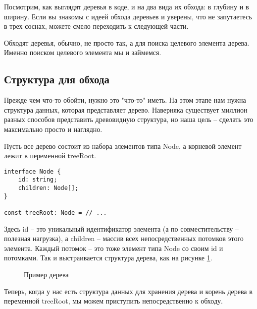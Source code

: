 \documentclass[../../article]{subfiles}
\begin{document}
{Посмотрим, как выглядят деревья в коде, и на два вида их обхода: в глубину и в ширину. Если вы знакомы с идеей обхода деревьев и уверены, что не запутаетесь в трех соснах, можете смело переходить к следующей части.}

Обходят деревья, обычно, не просто так, а для поиска целевого элемента дерева. Именно поиском целевого элемента мы и займемся.

\subsection{Структура для обхода}

Прежде чем что-то обойти, нужно это "что-то" иметь. На этом этапе нам нужна структура данных, которая представляет дерево. Наверняка существует миллион разных способов представить древовидную структура, но наша цель – сделать это максимально просто и наглядно.

Пусть все дерево состоит из набора элементов типа {\firacodebold Node}, а корневой элемент лежит в переменной {\firacodebold treeRoot}.
    \begin{ruledelement}
        \begin{lstlisting}[label={lst:treeStructure}]
interface Node {
    id: string;
    children: Node[];
}

const treeRoot: Node = // ...
        \end{lstlisting}
    \end{ruledelement}

Здесь {\firacodebold id} – это уникальный идентификатор элемента (а по совместительству – полезная нагрузка), а {\firacodebold children} – массив всех непосредственных потомков этого элемента. Каждый потомок – это тоже элемент типа {\firacodebold Node} со своим {\firacodebold id} и потомками. Так и выстраивается структура дерева, как на рисунке \ref{fig:exampleTree}.

\begin{figure}
    \caption{Пример дерева}
    \label{fig:exampleTree}
\end{figure}

Теперь, когда у нас есть структура данных для хранения дерева и корень дерева в переменной {\firacodebold treeRoot}, мы можем приступить непосредственно к обходу.
\end{document}
